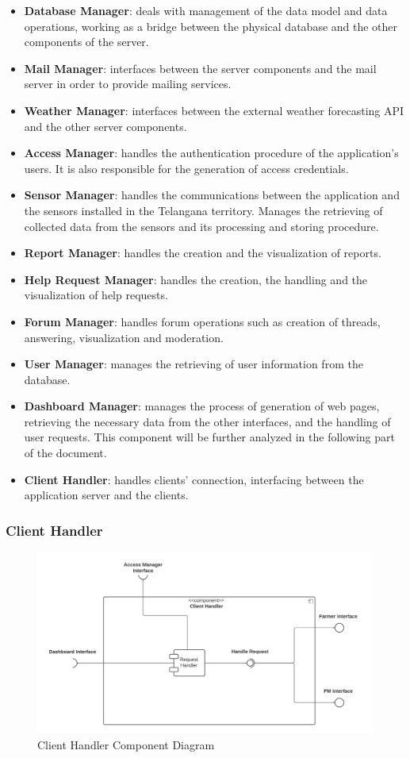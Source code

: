 \documentclass[10pt]{article} %
\begin{document}
\begin{itemize}
    \item \textbf{Database Manager}: deals with management of the data model and data operations, working as a bridge between the physical database 
    and the other components of the server.
    \item \textbf{Mail Manager}: interfaces between the server components and the mail server in order to provide mailing services.
    \item \textbf{Weather Manager}: interfaces between the external weather forecasting API and the other server components.
    \item \textbf{Access Manager}: handles the authentication procedure of the application's users. It is also responsible for the generation of access credentials.
    \item \textbf{Sensor Manager}: handles the communications between the application and the sensors installed in the Telangana territory. Manages the retrieving of 
        collected data from the sensors and its processing and storing procedure.
    \item \textbf{Report Manager}: handles the creation and the visualization of reports.
    \item \textbf{Help Request Manager}: handles the creation, the handling and the visualization of help requests.
    \item \textbf{Forum Manager}: handles forum operations such as creation of threads, answering, visualization and moderation.
    \item \textbf{User Manager}: manages the retrieving of user information from the database.
    \item \textbf{Dashboard Manager}: manages the process of generation of web pages, retrieving the necessary data from the other interfaces, and the handling of user requests. 
        This component will be further analyzed in the following part of the document.
    \item \textbf{Client Handler}: handles clients' connection, interfacing between the application server and the clients.
\end{itemize}
\subsubsection{Client Handler}
\begin{figure}[h]
    \centering 
    \includegraphics[scale=0.5]{images/clientHandler.png}
    \caption{Client Handler Component Diagram}
    \label{fig:client_handler}
\end{figure}
\end{document}
